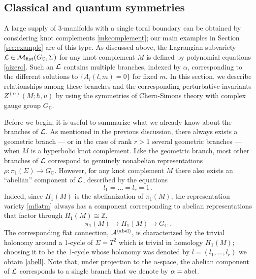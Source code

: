 \documentclass[hyper]{JHEP3}
\def\CA {{\cal A}}
\def\CL {{\cal L}}
\def\CM {{\cal M}}
\newcommand{\C}{{\mathbb{C}}}
\newcommand{\Z}{{\mathbb{Z}}}
\newcommand\be{\begin{equation}}
\newcommand\ee{\end{equation}}
\begin{document}

\subsection{Classical and quantum symmetries}
\label{sec:symmetries}

A large supply of 3-manifolds with a single toral boundary can be obtained
by considering knot complements \eqref{mkcomplement};
our main examples in Section \ref{sec:example} are of this type.
As discussed above, the Lagrangian subvariety $\CL\in\CM_{\rm flat}(G_\C,\Sigma)$
for any knot complement $M$ is defined by polynomial equations \eqref{aizero}.
Such an $\CL$ contains multiple branches, indexed by $\alpha$, corresponding
to the different solutions to $\{A_i(l,m)=0\}$ for fixed $m$.
In this section, we describe relationships among these branches and
the corresponding perturbative invariants $Z^{(\alpha)}(M;\hbar,u)$
by using the symmetries of Chern-Simons theory with complex gauge group $G_{\mathbb{C}}$.

Before we begin, it is useful to summarize what we already know about
the branches of ${\cal L}$. As mentioned in the previous discussion,
there always exists a geometric branch --- or in the case of rank $r>1$
several geometric branches --- when $M$ is a hyperbolic knot complement.
Like the geometric branch, most other branches of ${\cal L}$ correspond
to genuinely nonabelian representations $\rho:\pi_1(\Sigma)\rightarrow G_{\mathbb{C}}$.
However, for any knot complement $M$ there also exists
an ``abelian'' component of $\CL$, described by the equations
\be
l_1 = \ldots = l_r = 1\,.
\label{abell}
\ee
Indeed, since $H_1 (M)$ is the abelianization of $\pi_1 (M)$,
the representation variety \eqref{mflatm} always has a component
corresponding to abelian representations that factor through $H_1 (M) \cong \Z$,
\be
\pi_1 (M) \to H_1 (M) \to G_{\C}\,.
\ee
The  corresponding flat connection, $\CA^{({\rm abel})}$,
is characterized by the trivial holonomy
around a 1-cycle of $\Sigma = T^2$ which is trivial in homology $H_1 (M)$;
choosing it to be the 1-cycle whose holonomy was denoted by $l = (l_1, \ldots, l_r)$
we obtain \eqref{abell}.
Note that, under projection to the $u$-space, the abelian component of $\CL$
corresponds to a single branch that we denote by $\alpha = {\rm abel}$.
\end{document}
